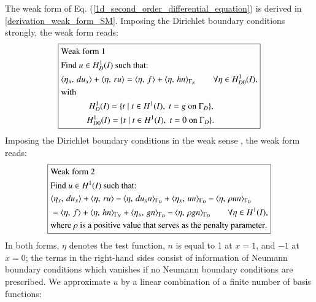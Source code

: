 \documentclass[review,3p]{elsarticle}
\begin{document}
The weak form of Eq. (\ref{1d_second_order_differential_equation}) is derived in \ref{derivation_weak_form_SM}. Imposing the Dirichlet boundary conditions strongly, the weak form reads:
\begin{equation}
\centering
\boxed{ 
\begin{aligned}
&\text{Weak~form}~ 1 ~~~~~~~~~\\
&\text{Find $u \in H _D^1 (I)$ such that:} \\
&\langle {\eta} _{ x }, \, du _{ x } \rangle + \langle\eta, \, ru\rangle = \langle\eta, \, f \rangle + \langle\eta, \, hn\rangle_{\Gamma _N} \qquad \forall \eta \in H _{D0}^1 (I),\\
&\text{with} \\
&~~~~~~~~~~~~~H_{D} ^1 (I) = \{t \; | \; t \in H^1 (I), \; t = g \text{ on } \Gamma _D \},  \\
&~~~~~~~~~~~~H_{D0} ^1 (I) = \{t \; | \; t \in H^1 (I), \; t = 0 \text{ on } \Gamma _D\}.\\
\end{aligned}		\label{sm_weak_form_Diri_strong} 
}
\end{equation}
Imposing the Dirichlet boundary conditions in the weak sense \cite{freund1995weakly}, the weak form reads:
\begin{equation}
\centering
\boxed{
\begin{aligned}
&\text{Weak~form}~ 2 ~~~~~~~~~\\
&\text{Find } u \in H ^1 (I) \text{ such that:}\\
& \langle { \eta} _{ x }, \, du_x \rangle + \langle \eta, \, ru \rangle - \langle \eta, \, du_x n \rangle_{\Gamma _D} + \langle \eta _x, \, u n \rangle_{\Gamma _D} - \langle \eta, \, \rho u n \rangle_{\Gamma _D} \\ 
&= \langle \eta, \, f \rangle + \langle \eta, \, h n \rangle_{\Gamma _N} + \langle \eta _x, \, g n \rangle_{\Gamma _D} - \langle \eta, \, \rho g n \rangle_{\Gamma _D} \qquad \forall \eta \in H ^1 (I), \\
&\text{where } \rho \text{ is a } \text{{positive}} \text{ value that serves as the penalty parameter}.
\end{aligned}	\label{sm_weak_form_Diri_weak}}
\end{equation}
In both forms, $\eta$ denotes the test function, $n$ is equal to 1 at $x=1$, and $-1$ at $x=0$; the terms in the right-hand sides consist of information of Neumann boundary conditions which vanishes if no Neumann boundary conditions are prescribed. We approximate $u$ by a linear combination of a finite number of basis functions:
\end{document}
